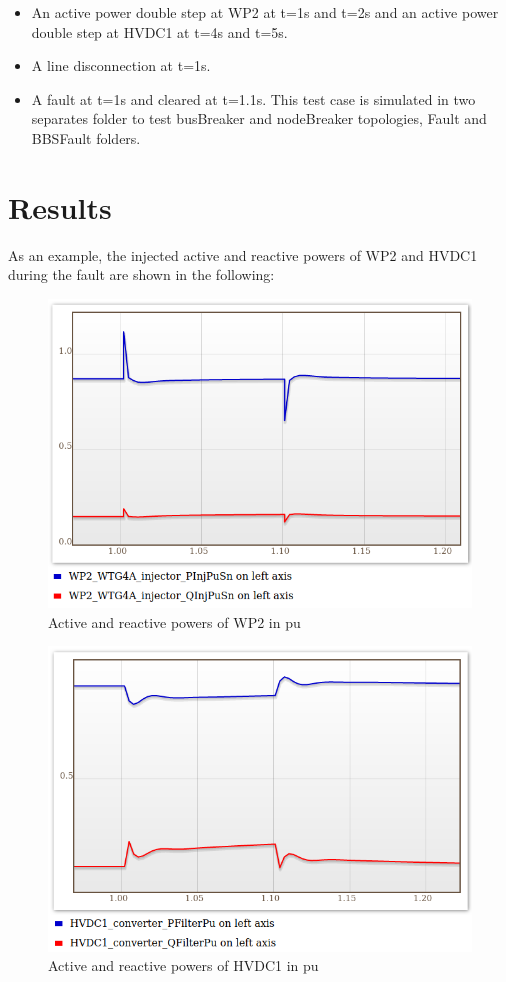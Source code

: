 \documentclass[a4paper, 12pt]{report}
\begin{document}
\begin{itemize}
\item An active power double step at WP2 at t=1s and t=2s and an active power double step at HVDC1 at t=4s and t=5s.
\item A line disconnection at t=1s.
\item A fault at t=1s and cleared at t=1.1s. This test case is simulated in two separates folder to test busBreaker and nodeBreaker topologies, Fault and BBSFault folders.
\end{itemize}

\section{Results}

\par As an example, the injected active and reactive powers of WP2 and HVDC1 during the fault are shown in the following:

\begin{figure}[H]
  \includegraphics[width=\textwidth]{PQWP2.png}
  \caption{Active and reactive powers of WP2 in pu}
\end{figure}

\begin{figure}[H]
  \includegraphics[width=\textwidth]{PQHVDC1.png}
  \caption{Active and reactive powers of HVDC1 in pu}
\end{figure}
\end{document}
